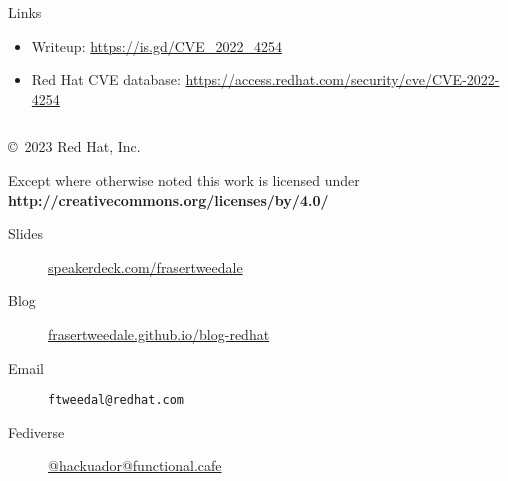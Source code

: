 \documentclass[ignorenonframetext,aspectratio=169,12pt]{beamer}
\begin{document}
\begin{frame}{Links}
\protect\hypertarget{links}{}

\begin{itemize}
\item Writeup: \url{https://is.gd/CVE_2022_4254}
\item Red Hat CVE database: \url{https://access.redhat.com/security/cve/CVE-2022-4254}
\end{itemize}

\end{frame}


\begin{frame}[plain]
\begin{columns}

  \begin{column}{.6\textwidth}

    \setlength{\parskip}{.5em}

    { \centering

    

    \copyright~2023  Red Hat, Inc.

    { \scriptsize
    Except where otherwise noted this work is licensed under
    }
    { \footnotesize
    \textbf{http://creativecommons.org/licenses/by/4.0/}
    }

    }

    \begin{description}
      \item[Slides] \href{https://speakerdeck.com/frasertweedale}{speakerdeck.com/frasertweedale}
      \item[Blog] \href{https://frasertweedale.github.io/blog-redhat/}{frasertweedale.github.io/blog-redhat}
      \item[Email] \texttt{ftweedal@redhat.com}
      \item[Fediverse] \href{https://functional.cafe/@hackuador}{@hackuador@functional.cafe}
    \end{description}
  \end{column}

\end{columns}
\end{frame}
\end{document}
